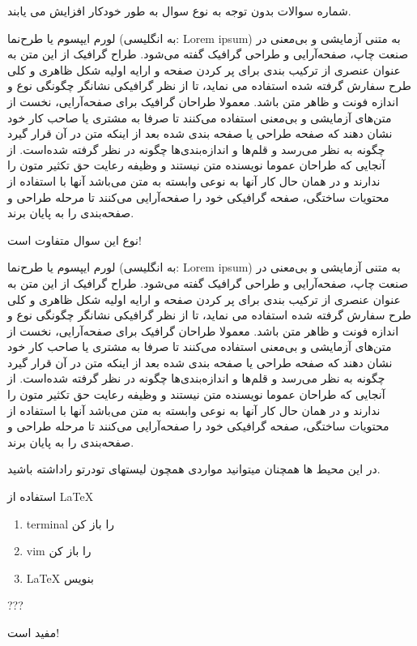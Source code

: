 \documentclass[11pt,largemargins]{homework}
\begin{document}
\question
  شماره سوالات بدون توجه به نوع سوال به طور خودکار افزایش می یابند.

  لورم ایپسوم یا طرح‌نما (به انگلیسی: Lorem ipsum) به متنی آزمایشی و بی‌معنی در صنعت چاپ، صفحه‌آرایی و طراحی گرافیک گفته می‌شود. طراح گرافیک از این متن به عنوان عنصری از ترکیب بندی برای پر کردن صفحه و ارایه اولیه شکل ظاهری و کلی طرح سفارش گرفته شده استفاده می نماید، تا از نظر گرافیکی نشانگر چگونگی نوع و اندازه فونت و ظاهر متن باشد. معمولا طراحان گرافیک برای صفحه‌آرایی، نخست از متن‌های آزمایشی و بی‌معنی استفاده می‌کنند تا صرفا به مشتری یا صاحب کار خود نشان دهند که صفحه طراحی یا صفحه بندی شده بعد از اینکه متن در آن قرار گیرد چگونه به نظر می‌رسد و قلم‌ها و اندازه‌بندی‌ها چگونه در نظر گرفته شده‌است. از آنجایی که طراحان عموما نویسنده متن نیستند و وظیفه رعایت حق تکثیر متون را ندارند و در همان حال کار آنها به نوعی وابسته به متن می‌باشد آنها با استفاده از محتویات ساختگی، صفحه گرافیکی خود را صفحه‌آرایی می‌کنند تا مرحله طراحی و صفحه‌بندی را به پایان برند.

\renewcommand{\questiontype}{تحقیق}
\question
  نوع این سوال متفاوت است!

  لورم ایپسوم یا طرح‌نما (به انگلیسی: Lorem ipsum) به متنی آزمایشی و بی‌معنی در صنعت چاپ، صفحه‌آرایی و طراحی گرافیک گفته می‌شود. طراح گرافیک از این متن به عنوان عنصری از ترکیب بندی برای پر کردن صفحه و ارایه اولیه شکل ظاهری و کلی طرح سفارش گرفته شده استفاده می نماید، تا از نظر گرافیکی نشانگر چگونگی نوع و اندازه فونت و ظاهر متن باشد. معمولا طراحان گرافیک برای صفحه‌آرایی، نخست از متن‌های آزمایشی و بی‌معنی استفاده می‌کنند تا صرفا به مشتری یا صاحب کار خود نشان دهند که صفحه طراحی یا صفحه بندی شده بعد از اینکه متن در آن قرار گیرد چگونه به نظر می‌رسد و قلم‌ها و اندازه‌بندی‌ها چگونه در نظر گرفته شده‌است. از آنجایی که طراحان عموما نویسنده متن نیستند و وظیفه رعایت حق تکثیر متون را ندارند و در همان حال کار آنها به نوعی وابسته به متن می‌باشد آنها با استفاده از محتویات ساختگی، صفحه گرافیکی خود را صفحه‌آرایی می‌کنند تا مرحله طراحی و صفحه‌بندی را به پایان برند.

\renewcommand{\questiontype}{سوال}

\question
  در این محیط ها همچنان میتوانید مواردی همچون لیستهای تودرتو راداشته باشید.
  \begin{alphaparts}
    \item استفاده از \LaTeX
      \begin{enumerate}
        \item  terminal را باز کن
        \item  vim را باز کن
        \item  LaTeX بنویس
      \end{enumerate}
    \item ???
    \item مفید است!
  \end{alphaparts}
\end{document}
